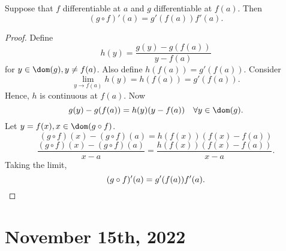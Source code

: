 \documentclass[11pt]{scrartcl}
\numberwithin{equation}{section}
\begin{document}
\begin{theorem}
    \label{thm:chain-rule}
    Suppose that $f$ differentiable at $a$ and $g$ differentiable at $f(a)$.
    Then 
    \[
        (g\circ f)'(a) = g'(f(a))f'(a).
    \]
\end{theorem}
\begin{proof}
    Define
    \[
        h(y) = \frac{g(y)-g(f(a))}{y-f(a)}
    \]
    for $y\in \dom(g), y\neq f(a)$.
    Also define $h(f(a)) = g'(f(a))$. Consider 
    \[
        \lim_{y\rightarrow f(a)}h(y) = h(f(a)) = g'(f(a)).
    \]
    Hence, $h$ is continuous at $f(a)$. Now 
    \[
        g(y) - g(f(a)) = h(y)(y-f(a)) \quad \forall y\in\dom(g).
    \]
    Let $y=f(x), x\in\dom(g\circ f)$.
    \[
        (g\circ f)(x) - (g\circ f)(a) = h(f(x))(f(x)-f(a))
    \] 
    \[
        \frac{(g\circ f)(x) - (g\circ f)(a)}{x-a} = \frac{h(f(x))(f(x)-f(a))}{x-a}.
    \]
    Taking the limit,
    \[
        (g\circ f)'(a) = g'(f(a))f'(a). \qedhere
    \]
\end{proof}
\clearpage
\section{November 15th, 2022}
\end{document}
